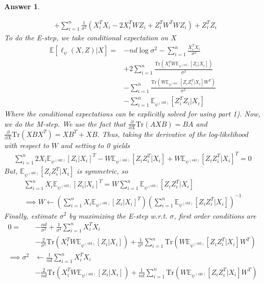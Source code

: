 \documentclass[12pt]{article}
\theoremstyle{colon}
\newtheorem*{answer}{Answer}
\begin{document}
\begin{answer}
\begin{enumerate}[label=\arabic*)]
\begin{align*}
        &+ \sum_{i=1}^n \frac{1}{\sigma^2} (X_i^T X_i - 2 X_i^T W Z_i + Z_i^T W^T W Z_i) + Z_i^T Z_i
      \end{align*}
      To do the E-step, we take conditional expectation on $X$
      \begin{align*}
        \mathbb{E}[ \ell_{\psi}(X,Z) | X] = &- n d \log \sigma^2 - \sum_{i=1}^n \frac{X_i^T X_i}{\sigma^2} \\
        &+ 2\sum_{i=1}^n \frac{\text{Tr}(X_i^T W \mathbb{E}_{\psi^{(\text{old})}}[Z_i | X_i])}{\sigma^2} \\
        &- \sum_{i=1}^n \frac{\text{Tr}(W \mathbb{E}_{\psi^{(\text{old})}}[Z_i Z_i^T | X_i] W^T)}{\sigma^2} \\
        &- \sum_{i=1}^n \mathbb{E}_{\psi^{(\text{old})}}[Z_i^T Z_i | X_i]
      \end{align*}
      Where the conditional expectations can be explicitly solved for using part 1). Now, we do the M-step. We use the fact that $\frac{\partial}{\partial X} \text{Tr} (AXB) = BA$ and $\frac{\partial}{\partial X} \text{Tr} (X B X^T) = X B^T + X B$. Thus, taking the derivative of the log-likelihood with respect to $W$ and setting to 0 yields
      \begin{gather*}
        \sum_{i=1}^n 2 X_i \mathbb{E}_{\psi^{(\text{old})}}[Z_i | X_i]^T - W \mathbb{E}_{\psi^{(\text{old})}}[Z_i Z_i^T | X_i] + W \mathbb{E}_{\psi^{(\text{old})}} [Z_i Z_i^T | X_i]^T = 0
      \end{gather*}
      But, $\mathbb{E}_{\psi^{(\text{old})}} [Z_i Z_i^T | X_i]$ is symmetric, so
      \begin{gather*}
        \sum_{i=1}^n X_i \mathbb{E}_{\psi^{(\text{old})}}[Z_i | X_i]^T = W \sum_{i=1}^n \mathbb{E}_{\psi^{(\text{old})}}[Z_i Z_i^T | X_i] \\
        \implies W \leftarrow \left( \sum_{i=1}^n X_i \mathbb{E}_{\psi^{(\text{old})}}[Z_i | X_i]^T \right) \left( \sum_{i=1}^n \mathbb{E}_{\psi^{(\text{old})}}[Z_i Z_i^T | X_i] \right)^{-1}
      \end{gather*}
      Finally, estimate $\sigma^2$ by maximizing the E-step w.r.t. $\sigma$, first order conditions are
      \begin{align*}
        0 = &-\frac{n d}{\sigma^2} + \frac{1}{\sigma^4} \sum_{i=1}^n X_i^T X_i \\
        &- \frac{2}{\sigma^4} \text{Tr}(X_i^T W \mathbb{E}_{\psi^{(\text{old})}}[Z_i | X_i]) + \frac{1}{\sigma^4} \sum_{i=1}^n \text{Tr}(W \mathbb{E}_{\psi^{(\text{old})}}[Z_i Z_i^T | X_i] W^T) \\
        \implies \sigma^2 &\leftarrow \frac{1}{n d} \sum_{i=1}^n X_i^T X_i \\
        &- \frac{2}{n d} \text{Tr}(X_i^T W \mathbb{E}_{\psi^{(\text{old})}}[Z_i | X_i]) + \frac{1}{n d} \sum_{i=1}^n \text{Tr}(W \mathbb{E}_{\psi^{(\text{old})}}[Z_i Z_i^T | X_i] W^T)
      \end{align*}
  \end{enumerate}
\end{answer}
\end{document}
